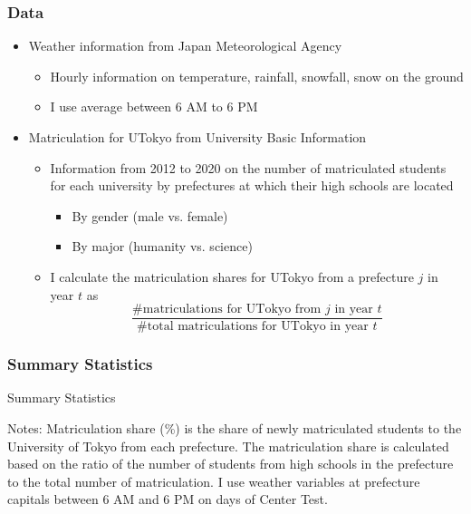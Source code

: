 \documentclass[10pt, pdfmx,hiresbb]{beamer}
\begin{document}
\begin{frame}\frametitle{Data}
  \begin{itemize}
    \item Weather information from Japan Meteorological Agency
      \begin{itemize}
        \item Hourly information on temperature, rainfall, snowfall, snow on the ground
        \item I use average between 6 AM to 6 PM
      \end{itemize}
    \item Matriculation for UTokyo from University Basic Information
      \begin{itemize}
        \item Information from 2012 to 2020 on the number of matriculated students for each university by prefectures at which their high schools are located
          \begin{itemize}
            \item By gender (male vs. female)
            \item By major (humanity vs. science)
          \end{itemize}
        \item I calculate the matriculation shares for UTokyo from a prefecture $j$ in year $t$ as 
          \begin{equation*}
            \frac{\text{\# matriculations for UTokyo from $j$ in year $t$}}{\text{\# total matriculations for UTokyo in year $t$}}
          \end{equation*}
      \end{itemize}
  \end{itemize}
\end{frame}

\begin{frame}\frametitle{Summary Statistics}
  \begin{center}
    \begin{table}
      \caption{Summary Statistics}
      \footnotesize
      
      \tiny
      \begin{tablenotes}
        \item 
          Notes:
          Matriculation share (\%) is the share of newly matriculated students to the University of Tokyo from each prefecture.
          The matriculation share is calculated based on the ratio of the number of students from high schools in the prefecture to the total number of matriculation.
          I use weather variables at prefecture capitals between 6 AM and 6 PM on days of Center Test.
      \end{tablenotes}
    \end{table}
  \end{center}
\end{frame}
\end{document}
